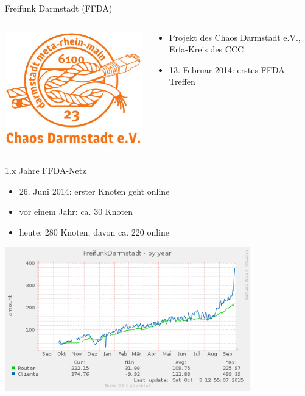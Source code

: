 \documentclass[10pt]{beamer}
\begin{document}
\begin{frame}{Freifunk Darmstadt (FFDA)}
	\begin{columns}[c]
		\begin{column}{4cm}
			\includegraphics[width=\textwidth]{images/cda}
		\end{column}
		\begin{column}{8cm}
			\begin{itemize}
				\item Projekt des Chaos Darmstadt e.V., Erfa-Kreis des CCC
				\item 13. Februar 2014: erstes FFDA-Treffen
			\end{itemize}
		\end{column}
	\end{columns}
\end{frame}
\begin{frame}{1.x Jahre FFDA-Netz}
	\vfill
	\begin{itemize}[<+->]
		\item 26. Juni 2014: erster Knoten geht online
		\item vor einem Jahr: ca. 30 Knoten
		\item heute: 280 Knoten, davon ca. 220 online
	\end{itemize}
	\pause
	\begin{center}
		\includegraphics[width=0.8\textwidth]{images/ffda-Okt14-15}
	\end{center}
\end{frame}
\end{document}
